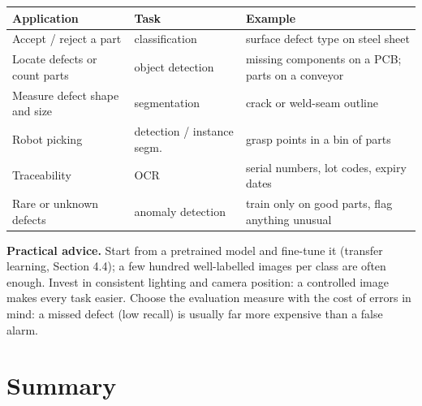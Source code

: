 \documentclass[12pt, a4paper]{article}
\begin{document}
\begin{center}
  \renewcommand{\arraystretch}{1.35}
  \begin{tabular}{>{\raggedright\arraybackslash}p{5.2cm}
      >{\raggedright\arraybackslash}p{3.6cm}
      >{\raggedright\arraybackslash}p{5.4cm}}
    \toprule
    Application                         & Task                    & Example                                         \\
    \midrule
    Accept / reject a part              & classification          & surface defect type on steel sheet              \\
    Locate defects or count parts       & object detection        & missing components on a PCB; parts on a conveyor \\
    Measure defect shape and size       & segmentation            & crack or weld-seam outline                      \\
    Robot picking                       & detection / instance segm. & grasp points in a bin of parts              \\
    Traceability                        & OCR                     & serial numbers, lot codes, expiry dates         \\
    Rare or unknown defects             & anomaly detection       & train only on good parts, flag anything unusual \\
    \bottomrule
  \end{tabular}
\end{center}

\begin{notebox}
  \textbf{Practical advice.} Start from a pretrained model and fine-tune it
  (transfer learning, Section 4.4); a few hundred well-labelled images per
  class are often enough. Invest in consistent lighting and camera position:
  a controlled image makes every task easier. Choose the evaluation measure
  with the cost of errors in mind: a missed defect (low recall) is usually
  far more expensive than a false alarm.
\end{notebox}

\section{Summary}
\end{document}
